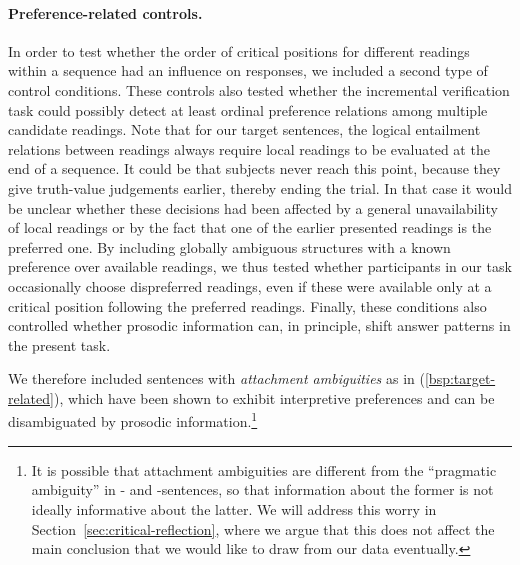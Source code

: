 \documentclass[fleqn,reqno,10pt]{article}
\newcommand{\as}{\acro{as}}
\renewcommand{\es}{\acro{es}}
\begin{document}
\paragraph{Preference-related controls.} In order to test whether the
order of critical positions for different readings within a sequence
had an influence on responses, we included a second type of control
conditions.  These controls also tested whether the incremental
verification task could possibly detect at least ordinal preference
relations among multiple candidate readings. Note that for our target
sentences, the logical entailment relations between readings always
require local readings to be evaluated at the end of a sequence. It
could be that subjects never reach this point, because they give
truth-value judgements earlier, thereby ending the trial. In that case
it would be unclear whether these decisions had been affected by a
general unavailability of local readings or by the fact that one of
the earlier presented readings is the preferred one. By including
globally ambiguous structures with a known preference over available
readings, we thus tested whether participants in our task occasionally
choose dispreferred readings, even if these were available only at a
critical position following the preferred readings. Finally, these
conditions also controlled whether prosodic information can, in
principle, shift answer patterns in the present task.

We therefore included sentences with \emph{attachment ambiguities} as
in (\ref{bsp:target-related}), which have been shown to exhibit
interpretive preferences and can be disambiguated by prosodic
information.\footnote{It is possible that attachment ambiguities are
  different from the ``pragmatic ambiguity'' in \as- and
  \es-sentences, so that information about the former is not ideally
  informative about the latter. We will address this worry in
  Section~\ref{sec:critical-reflection}, where we argue that this does
  not affect the main conclusion that we would like to draw from our
  data eventually.}
\end{document}
